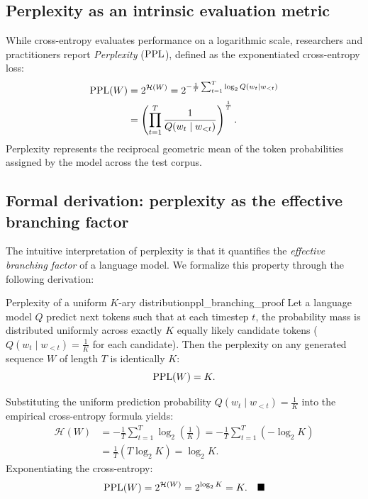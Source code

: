 \documentclass[../../main.tex]{subfiles}
\begin{document}
\subsection{Perplexity as an intrinsic evaluation metric}
While cross-entropy evaluates performance on a logarithmic scale, researchers and practitioners report \emph{Perplexity} ($\mathrm{PPL}$), defined as the exponentiated cross-entropy loss:
\begin{align}
\mathrm{PPL}(W) &= 2^{\mathcal{H}(W)} = 2^{-\frac{1}{T} \sum_{t=1}^T \log_2 Q(w_t \mid w_{<t})} \label{eq:ppl_base2} \\
&= \left( \prod_{t=1}^T \frac{1}{Q(w_t \mid w_{<t})} \right)^{\frac{1}{T}}. \label{eq:ppl_geometric}
\end{align}
Perplexity represents the reciprocal geometric mean of the token probabilities assigned by the model across the test corpus.

\subsection{Formal derivation: perplexity as the effective branching factor}
The intuitive interpretation of perplexity is that it quantifies the \emph{effective branching factor} of a language model. We formalize this property through the following derivation:

\begin{theorem}{Perplexity of a uniform $K$-ary distribution}{ppl_branching_proof}
Let a language model $Q$ predict next tokens such that at each timestep $t$, the probability mass is distributed uniformly across exactly $K$ equally likely candidate tokens ($Q(w_t \mid w_{<t}) = \frac{1}{K}$ for each candidate). Then the perplexity on any generated sequence $W$ of length $T$ is identically $K$:
\begin{equation}
\label{eq:ppl_equals_k}
\mathrm{PPL}(W) = K.
\end{equation}
\end{theorem}

Substituting the uniform prediction probability $Q(w_t \mid w_{<t}) = \frac{1}{K}$ into the empirical cross-entropy formula yields:
\begin{align*}
\mathcal{H}(W) &= - \frac{1}{T} \sum_{t=1}^T \log_2 \left( \frac{1}{K} \right) = - \frac{1}{T} \sum_{t=1}^T \left( - \log_2 K \right) \\
&= \frac{1}{T} \left( T \log_2 K \right) = \log_2 K.
\end{align*}
Exponentiating the cross-entropy:
\[
\mathrm{PPL}(W) = 2^{\mathcal{H}(W)} = 2^{\log_2 K} = K. \quad \blacksquare
\]
\end{document}
